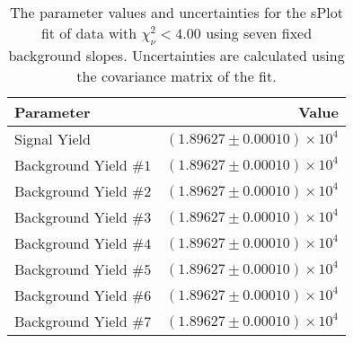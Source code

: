
\begin{table}[ht]
    \begin{center}
        \begin{tabular}{lr}\toprule
            Parameter & Value \\\midrule
            Signal Yield & $(1.89627 \pm 0.00010) \times 10^{4}$ \\
            Background Yield $\#1$ & $(1.89627 \pm 0.00010) \times 10^{4}$ \\
            Background Yield $\#2$ & $(1.89627 \pm 0.00010) \times 10^{4}$ \\
            Background Yield $\#3$ & $(1.89627 \pm 0.00010) \times 10^{4}$ \\
            Background Yield $\#4$ & $(1.89627 \pm 0.00010) \times 10^{4}$ \\
            Background Yield $\#5$ & $(1.89627 \pm 0.00010) \times 10^{4}$ \\
            Background Yield $\#6$ & $(1.89627 \pm 0.00010) \times 10^{4}$ \\
            Background Yield $\#7$ & $(1.89627 \pm 0.00010) \times 10^{4}$ \\\bottomrule
        \end{tabular}
        \caption{The parameter values and uncertainties for the sPlot fit of data with $\chi^2_\nu < 4.00$ using seven fixed background slopes. Uncertainties are calculated using the covariance matrix of the fit.}\label{tab:splot-fit-results-chisqdof-4.00-fixed-7}
    \end{center}
\end{table}
